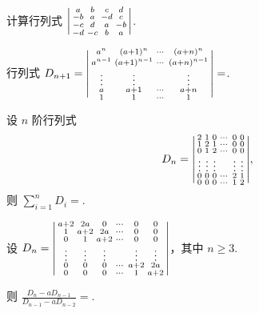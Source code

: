 	\begin{titwo}
		计算行列式 $\begin{vsmallmatrix}
			a & b & c & d \\
			-b & a & -d & c \\
			-c & d & a & -b \\
			-d & -c & b & a \\
		\end{vsmallmatrix}$.
	\end{titwo}

	\begin{titwo}
		行列式 $D_{n+1} = \begin{vsmallmatrix}
			a^{n} & (a + 1)^{n} & \cdots & (a + n)^{n} \\
			a^{n - 1} & (a + 1)^{n - 1} & \cdots & (a + n)^{n - 1} \\
			\vdots & \vdots &  & \vdots \\
			a & a + 1 & \cdots & a + n \\
			1 & 1 & \cdots & 1
		\end{vsmallmatrix} = $\htwo.
	\end{titwo}

	\begin{titwo}
		设 $n$ 阶行列式
		\[
			D_{n} = \begin{vsmallmatrix}
				2 & 1 & 0 & \cdots & 0 & 0 \\
				1 & 2 & 1 & \cdots & 0 & 0 \\
				0 & 1 & 2 & \cdots & 0 & 0 \\
				\vdots & \vdots & \vdots &  & \vdots & \vdots \\
				0 & 0 & 0 & \cdots & 2 & 1 \\
				0 & 0 & 0 & \cdots & 1 & 2
			\end{vsmallmatrix},
		\]
		则 $\sum_{i=1}^{n} D_{i} = $\htwo.
	\end{titwo}

	\begin{titwo}
		设 $D_{n} = \begin{vsmallmatrix}
			a + 2 & 2a & 0 & \cdots & 0 & 0 \\
			1 & a + 2 & 2a & \cdots & 0 & 0 \\
			0 & 1 & a + 2 & \cdots & 0 & 0 \\
			\vdots & \vdots & \vdots &  & \vdots & \vdots \\
			0 & 0 & 0 & \cdots & a + 2 & 2a \\
			0 & 0 & 0 & \cdots & 1 & a + 2 
		\end{vsmallmatrix}$，其中 $n \geq 3$.

		\noindent 则 $\frac{D_{n} - a D_{n - 1}}{D_{n - 1} - a D_{n - 2}} = $\htwo.
	\end{titwo}


